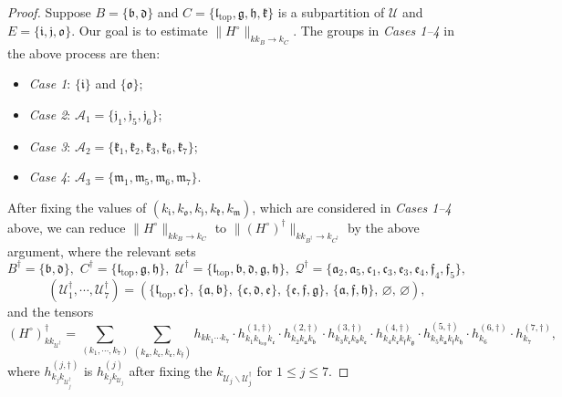 \documentclass[11 pt,reqno]{amsart}
\theoremstyle{definition}
\theoremstyle{remark}
\numberwithin{equation}{section}
\newcommand{\Qc}{\mathcal{Q}}
\newcommand{\Uc}{\mathcal{U}}
\newcommand{\Ac}{\mathcal{A}}
\newcommand{\ff}{\mathfrak{f}}
\newcommand{\hf}{\mathfrak{h}}
\newcommand{\lf}{\mathfrak{l}}
\newcommand{\mf}{\mathfrak{m}}
\newcommand{\af}{\mathfrak{a}}
\newcommand{\bff}{\mathfrak{b}}
\newcommand{\cf}{\mathfrak{c}}
\newcommand{\dff}{\mathfrak{d}}
\newcommand{\ef}{\mathfrak{e}}
\newcommand{\gf}{\mathfrak{g}}
\newcommand{\iif}{\mathfrak{i}}
\newcommand{\jf}{\mathfrak{j}}
\newcommand{\kf}{\mathfrak{k}}
\newcommand{\of}{\mathfrak{o}}
\begin{document}
{\begin{proof}
Suppose $B=\{\bff,\dff\}$ and $C=\{\lf_{\mathrm{top}},\gf, \hf, \kf\}$ is a subpartition of $\Uc$ and $E=\{\iif, \jf, \of\}$.
Our goal is to estimate $\|H^\circ\|_{kk_B\to k_C}$. The groups in \emph{Cases 1--4} in the above process are then:
\begin{itemize}
\item\emph{Case 1}: $\{\iif\}$ and $\{\of\}$;
\item\emph{Case 2}: $\Ac_1 =\{\jf_1, \jf_5, \jf_6\}$;
\item\emph{Case 3}: $\Ac_2 =\{\kf_1, \kf_2, \kf_3,\kf_6,\kf_7\}$;
\item\emph{Case 4}: $\Ac_3 = \{\mf_1, \mf_5,\mf_6,\mf_7\}$.
\end{itemize}
After fixing the values of $(k_\iif,k_\of,k_\jf,k_\kf,k_\mf)$, which are considered in \emph{Cases 1--4} above, we can reduce $\|H^\circ\|_{kk_B\to k_C}$ to $\|(H^\circ)^\dagger\|_{kk_{B^\dagger}\to k_{C^\dagger}}$ by the above argument, where the relevant sets
\begin{equation}\label{prop6.4:example}
B^\dagger =\{\bff,\dff\},\,\, C^{\dagger} =\{\lf_{\mathrm{top}}, \gf, \hf\},\,\, \Uc^\dagger = \{\lf_{\mathrm{top}},\bff,\dff, \gf, \hf\},\,\, \Qc^{\dagger} =\{\af_2, \af_5, \cf_1,\cf_3, \ef_3, \ef_4, \ff_4, \ff_5\},
\end{equation}
\[(\Uc_1^\dagger,\cdots, \Uc_7^\dagger)=(\{\lf_{\mathrm{top}}, \cf\},\,\{\af, \bff\},\,\{\cf, \dff, \ef\},\,\{\ef, \ff, \gf\},\,\{\af, \ff, \hf\},\,\varnothing,\,\varnothing),\] and the tensors
\[(H^\circ)_{kk_{\Uc^\dagger}}^\dagger=\sum_{(k_1,\cdots,k_7)}\sum_{(k_\af,k_\cf,k_\ef,k_\ff)}h_{kk_1\cdots k_7}\cdot h^{(1,\dagger)}_{k_1k_{\lf_{\mathrm{top}}}k_\cf }\cdot h^{(2,\dagger)}_{k_2k_\af k_\bff }\cdot h^{(3,\dagger)}_{k_3k_\cf k_\dff k_\ef }\cdot h^{(4,\dagger)}_{k_4k_\ef k_\ff k_\gf}\cdot h^{(5,\dagger)}_{k_5k_\af k_\ff k_\hf }\cdot h^{(6,\dagger)}_{k_6 }\cdot h^{(7,\dagger)}_{k_7},\] where $h_{k_jk_{\Uc_j^\dagger}}^{(j,\dagger)}$ is $h_{k_jk_{\Uc_j}}^{(j)}$ after fixing the $k_{\Uc_j\backslash\Uc_j^\dagger}$ for $1\leq j\leq 7$.


\end{proof}}
\end{document}
